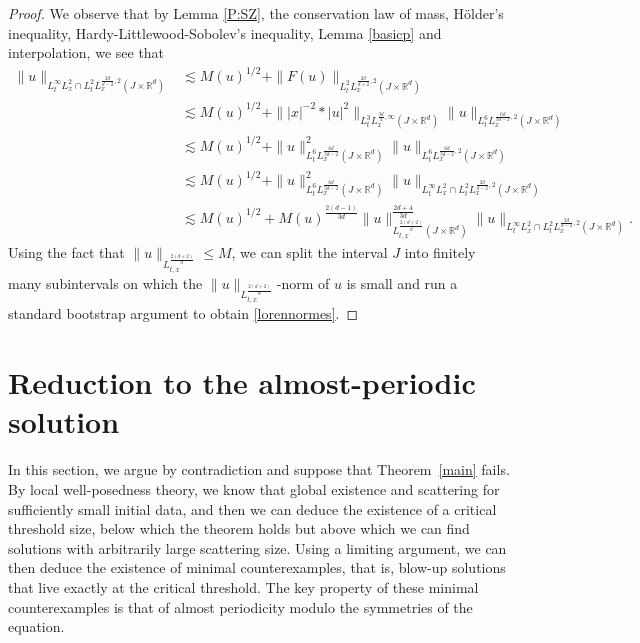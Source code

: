 \documentclass[reqno,11pt]{amsart}
\theoremstyle{plain}
\theoremstyle{definition}
\numberwithin{equation}{section}
\numberwithin{theorem}{section}
\def\leq{\leqslant}
\def\R{\mathbb{R}}
\begin{document}
\begin{proof}
We observe that by Lemma \ref{P:SZ}, the conservation law of mass, H\"older's inequality, Hardy-Littlewood-Sobolev's inequality, Lemma \ref{basicp} and interpolation, we see that
\begin{align*}
\|u\|_{L_t^{\infty}L_x^2\cap L_t^2L_x^{\frac{2d}{d-2},2}(J\times\R^d)}&\lesssim M(u)^{1/2} +\|F(u)\|_{L_t^{2}L_{x}^{\frac{2d}{d+2},2}(J\times\R^d)}\\
&\lesssim M(u)^{1/2} +\||x|^{-2}\ast|u|^2\|_{L_t^{3}L_{x}^{\frac{3d}{4},\infty}(J\times\R^d)}\|u\|_{L_t^{6}L_x^{\frac{6d}{3d-2},2}(J\times\R^d)}\\
&\lesssim M(u)^{1/2}+\|u\|^2_{L_t^{6}L_x^{\frac{6d}{3d-2}}(J\times\R^d)}\|u\|_{L_t^{6}L_x^{\frac{6d}{3d-2},2}(J\times\R^d)}\\
&\lesssim M(u)^{1/2}+\|u\|^2_{L_t^{6}L_x^{\frac{6d}{3d-2}}(J\times\R^d)}\|u\|_{L_t^{\infty}L_x^2\cap L_t^2L_x^{\frac{2d}{d-2},2}(J\times\R^d)}\\
&\lesssim M(u)^{1/2}+M(u)^{\frac{2(d-1)}{3d}}\|u\|^{\frac{2d+4}{3d}}_{L_{t,x}^{\frac{2(d+2)}{d}}(J\times\R^d)}\|u\|_{L_t^{\infty}L_x^2\cap L_t^2L_x^{\frac{2d}{d-2},2}(J\times\R^d)}.
\end{align*}
Using the fact that $\|u\|_{L_{t,x}^{\frac{2(d+2)}{d}}}\leq M$, we can split the interval $J$ into finitely many subintervals on which the $\|u\|_{L_{t,x}^{\frac{2(d+2)}{d}}}$-norm of $u$ is small and run a standard bootstrap argument to obtain \eqref{lorennormes}.
\end{proof}


\section{Reduction to the almost-periodic solution}\label{sec3}

In this section, we argue by contradiction and suppose that Theorem~\ref{main} fails. By local well-posedness theory, we know that global existence and scattering for sufficiently small initial data, and then we can deduce the existence of a critical threshold size, below which the theorem holds but above which we can find solutions with arbitrarily large scattering size. Using a limiting argument, we can then deduce the existence of minimal counterexamples, that is, blow-up solutions that live exactly at the critical threshold. The key property of these minimal counterexamples is that of almost periodicity modulo the symmetries of the equation. 
\end{document}
